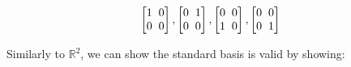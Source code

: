 \documentclass[11pt]{article}
\begin{document}
\begin{center}
\[
\begin{bmatrix}
   1  \hspace{2mm}    0  \\
    0   \hspace{2mm}  0 
            
\end{bmatrix}
,
\begin{bmatrix}
   0  \hspace{2mm}    1  \\
    0   \hspace{2mm}  0 
            
\end{bmatrix}
,
\begin{bmatrix}
   0 \hspace{2mm}    0  \\
    1   \hspace{2mm}  0 
            
\end{bmatrix}
,
\begin{bmatrix}
   0  \hspace{2mm}    0  \\
    0   \hspace{2mm}  1 
            
\end{bmatrix}
\]
\end{center}

Similarly to $\mathbb{R}^{2}$, we can show the standard basis is valid by showing:
\end{document}
